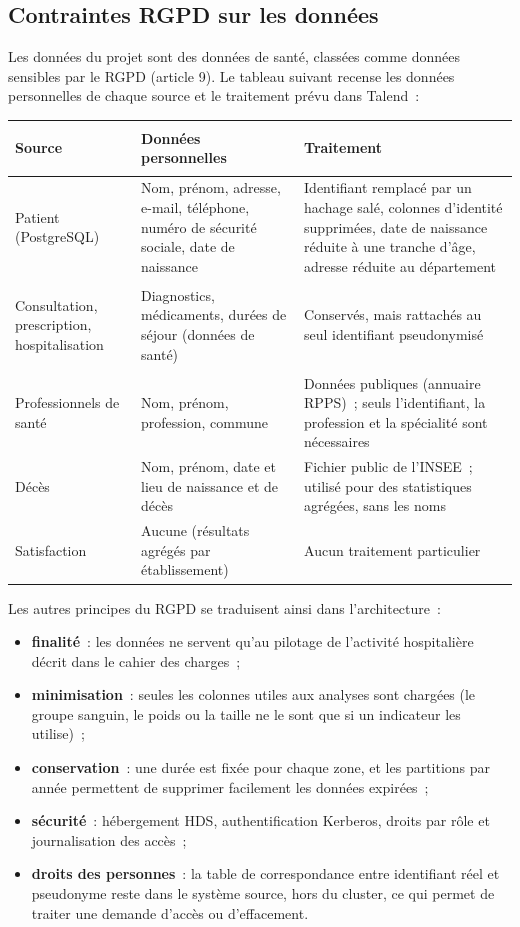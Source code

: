 \subsection{Contraintes RGPD sur les données}

\noindent Les données du projet sont des données de santé, classées comme données sensibles par le RGPD (article 9). Le tableau suivant recense les données personnelles de chaque source et le traitement prévu dans Talend~:

\begin{center}
\small
\begin{tabularx}{\textwidth}{>{\bfseries\raggedright\arraybackslash}p{3cm} >{\raggedright\arraybackslash}X >{\raggedright\arraybackslash}X}
\toprule
Source & Données personnelles & Traitement \\
\midrule
Patient (PostgreSQL) & Nom, prénom, adresse, e-mail, téléphone, numéro de sécurité sociale, date de naissance & Identifiant remplacé par un hachage salé, colonnes d'identité supprimées, date de naissance réduite à une tranche d'âge, adresse réduite au département \\
Consultation, prescription, hospitali\-sation & Diagnostics, médicaments, durées de séjour (données de santé) & Conservés, mais rattachés au seul identifiant pseudonymisé \\
Professionnels de santé & Nom, prénom, profession, commune & Données publiques (annuaire RPPS)~; seuls l'identifiant, la profession et la spécialité sont nécessaires \\
Décès & Nom, prénom, date et lieu de naissance et de décès & Fichier public de l'INSEE~; utilisé pour des statistiques agrégées, sans les noms \\
Satisfaction & Aucune (résultats agrégés par établissement) & Aucun traitement particulier \\
\bottomrule
\end{tabularx}
\end{center}

\noindent Les autres principes du RGPD se traduisent ainsi dans l'architecture~:
\begin{itemize}
	\item \textbf{finalité}~: les données ne servent qu'au pilotage de l'activité hospitalière décrit dans le cahier des charges~;
	\item \textbf{minimisation}~: seules les colonnes utiles aux analyses sont chargées (le groupe sanguin, le poids ou la taille ne le sont que si un indicateur les utilise)~;
	\item \textbf{conservation}~: une durée est fixée pour chaque zone, et les partitions par année permettent de supprimer facilement les données expirées~;
	\item \textbf{sécurité}~: hébergement HDS, authentification Kerberos, droits par rôle et journalisation des accès~;
	\item \textbf{droits des personnes}~: la table de correspondance entre identifiant réel et pseudonyme reste dans le système source, hors du cluster, ce qui permet de traiter une demande d'accès ou d'effacement.
\end{itemize}

